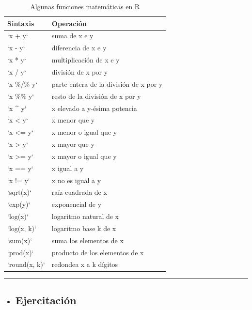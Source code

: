 \documentclass[]{book}
\newenvironment{rmdblock}[1]
{\begin{shaded*}
		\begin{itemize}
			\renewcommand{\labelitemi}{
				\raisebox{-.7\height}[0pt][0pt]{
					{\setkeys{Gin}{width=3em,keepaspectratio}\texttt{[image: images/\#1]}}
				}
			}
			\item
		}
		{
		\end{itemize}
	\end{shaded*}
}
\newenvironment{rmdtip}
{\begin{rmdblock}{tip}}
	{\end{rmdblock}}
\begin{document}
\begin{longtable}[t]{ll}
\caption{\label{tab:funcbasic}Algunas funciones matemáticas en R}\\
\toprule
Sintaxis & Operación\\
\midrule
`x + y` & suma de x e y\\
`x - y` & diferencia de x e y\\
`x * y` & multiplicación de x e y\\
`x / y` & división de x por y\\
`x \%/\% y` & parte entera de la división de x por y\\
\addlinespace
`x \%\% y` & resto de la división de x por y\\
`x \textasciicircum{} y` & x elevado a y-ésima potencia\\
`x < y` & x menor que y\\
`x <= y` & x menor o igual que y\\
`x > y` & x mayor que y\\
\addlinespace
`x >= y` & x mayor o igual que y\\
`x == y` & x igual a y\\
`x != y` & x no es igual a y\\
`sqrt(x)` & raíz cuadrada de x\\
`exp(y)` & exponencial de y\\
\addlinespace
`log(x)` & logaritmo natural de x\\
`log(x, k)` & logaritmo base k de x\\
`sum(x)` & suma los elementos de x\\
`prod(x)` & producto de los elementos de x\\
`round(x, k)` & redondea x a k dígitos\\
\bottomrule
\end{longtable}

\begin{center}\rule{0.5\linewidth}{\linethickness}\end{center}

\begin{rmdtip}
\subsection{Ejercitación}\label{ejercitacion}
\end{rmdtip}
\end{document}
